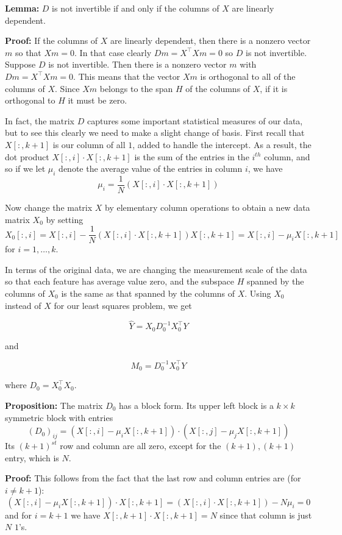 \documentclass[
  11pt,
  letterpaper,
]{scrbook}
\theoremstyle{plain}
\theoremstyle{plain}
\theoremstyle{remark}
\begin{document}
\textbf{Lemma:} \(D\) is not invertible if and only if the columns of
\(X\) are linearly dependent.

\textbf{Proof:} If the columns of \(X\) are linearly dependent, then
there is a nonzero vector \(m\) so that \(Xm=0\). In that case clearly
\(Dm=X^{\intercal}Xm=0\) so \(D\) is not invertible. Suppose \(D\) is
not invertible. Then there is a nonzero vector \(m\) with
\(Dm=X^{\intercal}Xm=0\). This means that the vector \(Xm\) is
orthogonal to all of the columns of \(X\). Since \(Xm\) belongs to the
span \(H\) of the columns of \(X\), if it is orthogonal to \(H\) it must
be zero.

In fact, the matrix \(D\) captures some important statistical measures
of our data, but to see this clearly we need to make a slight change of
basis. First recall that \(X[:,k+1]\) is our column of all \(1\), added
to handle the intercept. As a result, the dot product
\(X[:,i]\cdot X[:,k+1]\) is the sum of the entries in the \(i^{th}\)
column, and so if we let \(\mu_{i}\) denote the average value of the
entries in column \(i\), we have \[ \mu_{i} = \frac{1}{N}(X[:,i]\cdot
X[:,k+1]) \]

Now change the matrix \(X\) by elementary column operations to obtain a
new data matrix \(X_{0}\) by setting \[ X_{0}[:,i] =
X[:,i]-\frac{1}{N}(X[:,i]\cdot X[:,k+1])X[:,k+1] =
X[:,i]-\mu_{i}X[:,k+1] \] for \(i=1,\ldots, k\).

In terms of the original data, we are changing the measurement scale of
the data so that each feature has average value zero, and the subspace
\(H\) spanned by the columns of \(X_{0}\) is the same as that spanned by
the columns of \(X\). Using \(X_{0}\) instead of \(X\) for our least
squares problem, we get

\[ \hat{Y} = X_{0}D_{0}^{-1}X_{0}^{\intercal}Y \]

and

\[ M_{0} = D_{0}^{-1}X_{0}^{\intercal}Y \]

where \(D_{0}=X_{0}^{\intercal}X_{0}.\)

\textbf{Proposition:} The matrix \(D_{0}\) has a block form. Its upper
left block is a \(k\times k\) symmetric block with entries
\[ (D_{0})_{ij} =
(X[:,i]-\mu_{i}X[:,k+1])\cdot(X[:,j]-\mu_{j}X[:,k+1]) \] Its
\((k+1)^{st}\) row and column are all zero, except for the
\((k+1),(k+1)\) entry, which is \(N\).

\textbf{Proof:} This follows from the fact that the last row and column
entries are (for \(i\not=k+1\)): \[ (X[:,i]-\mu_{i}X[:,k+1])\cdot
X[:,k+1] = (X[:,i]\cdot X[:,k+1])-N\mu_{i} = 0 \] and for \(i=k+1\) we
have \(X[:,k+1]\cdot X[:,k+1]=N\) since that column is just \(N\)
\(1\)'s.
\end{document}
